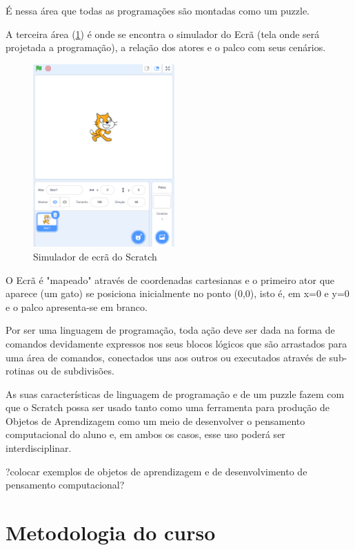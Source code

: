 \documentclass[12pt, openright, a4paper, brazil, openany, oneside]{abntex2}
\begin{document}
É nessa área que todas as programações são montadas como um puzzle.


A terceira área (\ref{scr4}) é onde se encontra o simulador do Ecrã (tela onde será projetada a programação), a relação dos atores e o palco com seus cenários.

\begin{figure}[h]

    \center

    \includegraphics[height=7cm]{scratch4.png}
    \caption{Simulador de ecrã do Scratch \label{scr4}}
    
\end{figure}

O Ecrã é "mapeado" através de coordenadas cartesianas e o primeiro ator que aparece (um gato) se posiciona inicialmente no ponto (0,0), isto é, em x=0 e y=0 e o palco apresenta-se em branco.


Por ser uma linguagem de programação, toda ação deve ser dada na forma de comandos devidamente expressos nos seus blocos lógicos que são arrastados para uma área de comandos, conectados uns aos outros ou executados através de sub-rotinas ou de subdivisões. 
 
 As suas características de linguagem de programação e de um puzzle fazem com que o Scratch possa ser usado tanto como uma ferramenta para produção de Objetos de Aprendizagem como um meio de desenvolver o pensamento computacional do aluno e, em ambos os casos, esse uso poderá ser interdisciplinar. 

?colocar exemplos de objetos de aprendizagem e de desenvolvimento de pensamento computacional?

\chapter{Metodologia do curso}



\end{document}
